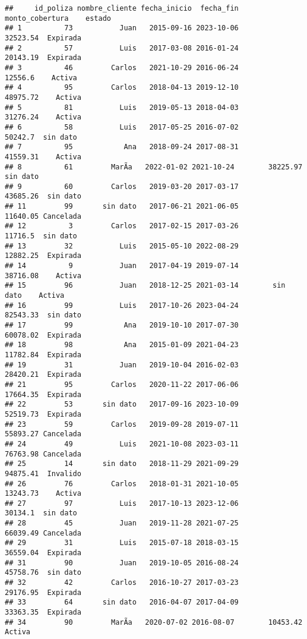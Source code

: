 \documentclass[
]{article}
\begin{document}
\begin{verbatim}
##     id_poliza nombre_cliente fecha_inicio  fecha_fin monto_cobertura    estado
## 1          73           Juan   2015-09-16 2023-10-06        32523.54  Expirada
## 2          57           Luis   2017-03-08 2016-01-24        20143.19  Expirada
## 3          46         Carlos   2021-10-29 2016-06-24         12556.6    Activa
## 4          95         Carlos   2018-04-13 2019-12-10        48975.72    Activa
## 5          81           Luis   2019-05-13 2018-04-03        31276.24    Activa
## 6          58           Luis   2017-05-25 2016-07-02         50242.7  sin dato
## 7          95            Ana   2018-09-24 2017-08-31        41559.31    Activa
## 8          61         MarÃ­a   2022-01-02 2021-10-24        38225.97  sin dato
## 9          60         Carlos   2019-03-20 2017-03-17        43685.26  sin dato
## 11         99       sin dato   2017-06-21 2021-06-05        11640.05 Cancelada
## 12          3         Carlos   2017-02-15 2017-03-26         11716.5  sin dato
## 13         32           Luis   2015-05-10 2022-08-29        12882.25  Expirada
## 14          9           Juan   2017-04-19 2019-07-14        38716.08    Activa
## 15         96           Juan   2018-12-25 2021-03-14        sin dato    Activa
## 16         99           Luis   2017-10-26 2023-04-24        82543.33  sin dato
## 17         99            Ana   2019-10-10 2017-07-30        60078.02  Expirada
## 18         98            Ana   2015-01-09 2021-04-23        11782.84  Expirada
## 19         31           Juan   2019-10-04 2016-02-03        28420.21  Expirada
## 21         95         Carlos   2020-11-22 2017-06-06        17664.35  Expirada
## 22         53       sin dato   2017-09-16 2023-10-09        52519.73  Expirada
## 23         59         Carlos   2019-09-28 2019-07-11        55893.27 Cancelada
## 24         49           Luis   2021-10-08 2023-03-11        76763.98 Cancelada
## 25         14       sin dato   2018-11-29 2021-09-29        94875.41  Invalido
## 26         76         Carlos   2018-01-31 2021-10-05        13243.73    Activa
## 27         97           Luis   2017-10-13 2023-12-06         30134.1  sin dato
## 28         45           Juan   2019-11-28 2021-07-25        66039.49 Cancelada
## 29         31           Luis   2015-07-18 2018-03-15        36559.04  Expirada
## 31         90           Juan   2019-10-05 2016-08-24        45758.76  sin dato
## 32         42         Carlos   2016-10-27 2017-03-23        29176.95  Expirada
## 33         64       sin dato   2016-04-07 2017-04-09        33363.35  Expirada
## 34         90         MarÃ­a   2020-07-02 2016-08-07        10453.42    Activa

\end{verbatim}
\end{document}

